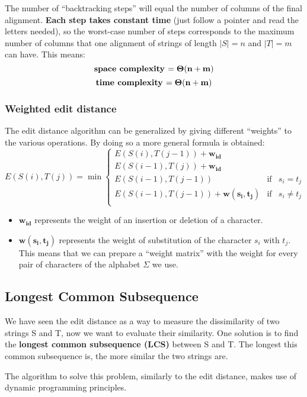 \documentclass[12pt, letterpaper]{article}
\begin{document}
The number of ``backtracking steps'' will equal the number of columns of the final alignment. \textbf{Each step takes constant time} (just follow a pointer and read the letters needed), so the worst-case number of steps corresponds to the maximum number of columns that one alignment of strings of length $|S|=n$ and $|T|=m$ can have. This means:
$$\mbox{\textbf{space complexity }} \mathbf{= \Theta(n+m)}$$
$$\mbox{\textbf{time complexity }} \mathbf{= \Theta(n+m)}$$

\subsubsection{Weighted edit distance}

The edit distance algorithm can be generalized by giving different ``weights'' to the various operations. By doing so a more general formula is obtained:
$$
E(S(i), T(j)) = \min \left\{\begin{array}{rcl}
E(S(i), T(j-1)) + \mathbf{w_{id}} \\ 
E(S(i-1), T(j)) + \mathbf{w_{id}} \\
E(S(i-1), T(j-1)) & \mbox{if} & s_i = t_j \\
E(S(i-1), T(j-1)) + \mathbf{w(s_i, t_j)} & \mbox{if} & s_i \neq t_j \\
\end{array}
\right.
$$
\begin{itemize}
\item $\mathbf{w_{id}}$ represents the weight of an insertion or deletion of a character.
\item $\mathbf{w(s_i, t_j)}$ represents the weight of substitution of the character $s_i$ with $t_j$. This means that we can prepare a ``weight matrix'' with the weight for every pair of characters of the alphabet $\Sigma$ we use.
\end{itemize}

\subsection{Longest Common Subsequence}

We have seen the edit distance as a way to measure the dissimilarity of two strings S and T, now we want to evaluate their similarity. One solution is to find the \textbf{longest common subsequence (LCS)} between S and T. The longest this common subsequence is, the more similar the two strings are.

The algorithm to solve this problem, similarly to the edit distance, makes use of dynamic programming principles.
\end{document}
